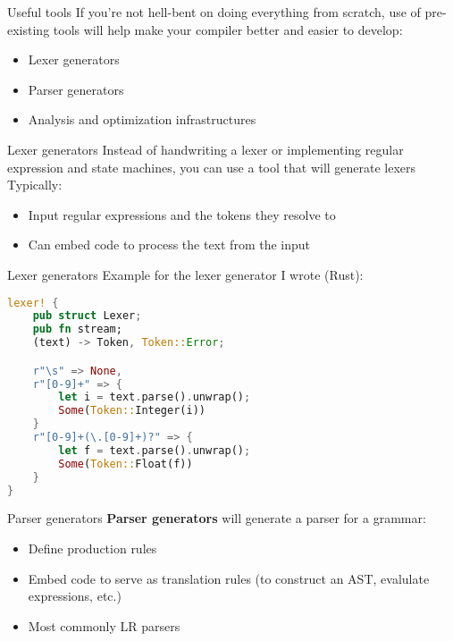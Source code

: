 \documentclass[../index.tex]{subfiles}
\begin{document}
\renewcommand{\currenttitle}{Useful tools}
\begin{frame}{\currenttitle}
  If you're not hell-bent on doing everything from scratch, use of pre-existing
  tools will help make your compiler better and easier to develop:

  \begin{itemize}
    \item Lexer generators
    \item Parser generators
    \item Analysis and optimization infrastructures
  \end{itemize}
\end{frame}

\renewcommand{\currenttitle}{Lexer generators}
\begin{frame}{\currenttitle}
  Instead of handwriting a lexer or implementing regular expression and state
  machines, you can use a tool that will generate lexers \\[1.5em]

  Typically:

  \begin{itemize}
    \item Input regular expressions and the tokens they resolve to
    \item Can embed code to process the text from the input
  \end{itemize}
\end{frame}

\begin{frame}[fragile]{\currenttitle}
  \vspace*{1em}
  Example for the lexer generator I wrote (Rust): \\[1em]

  \begin{lstlisting}[language=Rust]
lexer! {
    pub struct Lexer;
    pub fn stream;
    (text) -> Token, Token::Error;

    r"\s" => None,
    r"[0-9]+" => {
        let i = text.parse().unwrap();
        Some(Token::Integer(i))
    }
    r"[0-9]+(\.[0-9]+)?" => {
        let f = text.parse().unwrap();
        Some(Token::Float(f))
    }
}
  \end{lstlisting}
\end{frame}

\renewcommand{\currenttitle}{Parser generators}
\begin{frame}{\currenttitle}
  \textbf{Parser generators} will generate a parser for a grammar:

  \begin{itemize}
    \item Define production rules
    \item Embed code to serve as translation rules (to construct an AST,
      evalulate expressions, etc.)
    \item Most commonly LR parsers
  \end{itemize}
\end{frame}
\end{document}
